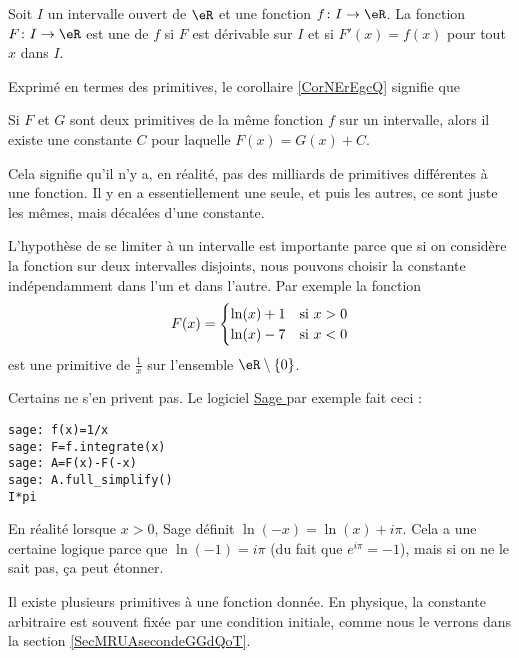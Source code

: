 \begin{definition}  \label{DefXVMVooWhsfuI}
    Soit \( I\) un intervalle ouvert de \( \eR\) et une fonction \( f\colon I\to \eR\). La fonction \( F\colon I\to \eR\) est une  de \( f\) si \( F\) est dérivable sur \( I\) et si \( F'(x)=f(x)\) pour tout \( x\) dans \( I\).
\end{definition}

Exprimé en termes des primitives, le corollaire \ref{CorNErEgcQ} signifie que
\begin{corollary}  \label{CorZeroCst}
    Si $F$ et $G$ sont deux primitives de la même fonction $f$ sur un intervalle, alors il existe une constante $C$ pour laquelle $F(x)=G(x)+C$.
\end{corollary}
Cela signifie qu'il n'y a, en réalité, pas des milliards de primitives différentes à une fonction. Il y en a essentiellement une seule, et puis les autres, ce sont juste les mêmes, mais décalées d'une constante.

\begin{remark}
    L'hypothèse de se limiter à un intervalle est importante parce que si on considère la fonction sur deux intervalles disjoints, nous pouvons choisir la constante indépendamment dans l'un et dans l'autre. Par exemple la fonction
    \begin{equation}
        F(x)=\begin{cases}
            \ln(x)+1    &   \text{si \( x>0\)}\\
            \ln(x)-7    &    \text{si \( x<0\)}
        \end{cases}
    \end{equation}
    est une primitive de \( \frac{1}{ x }\) sur l'ensemble \( \eR\setminus\{ 0 \}\).

    Certains ne s'en privent pas. Le logiciel \href{ http://sagemath.org }{ Sage } par exemple fait ceci :
    \begin{verbatim}
sage: f(x)=1/x
sage: F=f.integrate(x)
sage: A=F(x)-F(-x)
sage: A.full_simplify()
I*pi
    \end{verbatim}
    En réalité lorsque \( x>0\), Sage définit \( \ln(-x)=\ln(x)+i\pi\). Cela a une certaine logique parce que \( \ln(-1)=i\pi\) (du fait que \(  e^{i\pi}=-1\)), mais si on ne le sait pas, ça peut étonner.
\end{remark}

\begin{normaltext}
    Il existe plusieurs primitives à une fonction donnée. En physique, la constante arbitraire est souvent fixée par une condition initiale, comme nous le verrons dans la section \ref{SecMRUAsecondeGGdQoT}.
\end{normaltext}



